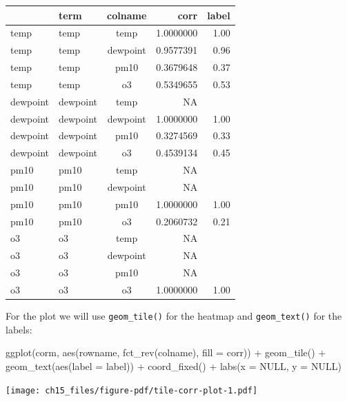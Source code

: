 \documentclass[
  letterpaper,
  DIV=11,
  numbers=noendperiod]{scrreprt}
\newenvironment{Shaded}{\begin{snugshade}}{\end{snugshade}}
\newcommand{\AttributeTok}[1]{\textcolor[rgb]{0.40,0.45,0.13}{#1}}
\newcommand{\ConstantTok}[1]{\textcolor[rgb]{0.56,0.35,0.01}{#1}}
\newcommand{\FunctionTok}[1]{\textcolor[rgb]{0.28,0.35,0.67}{#1}}
\newcommand{\NormalTok}[1]{\textcolor[rgb]{0.00,0.23,0.31}{#1}}
\newcommand{\SpecialCharTok}[1]{\textcolor[rgb]{0.37,0.37,0.37}{#1}}
\begin{document}
\begin{longtable*}{l|lcrr}
\toprule
{} & term & colname & corr & label \\ 
\midrule\addlinespace[2.5pt]
temp & temp & temp & 1.0000000 & 1.00 \\ 
temp & temp & dewpoint & 0.9577391 & 0.96 \\ 
temp & temp & pm10 & 0.3679648 & 0.37 \\ 
temp & temp & o3 & 0.5349655 & 0.53 \\ 
dewpoint & dewpoint & temp & NA &  \\ 
dewpoint & dewpoint & dewpoint & 1.0000000 & 1.00 \\ 
dewpoint & dewpoint & pm10 & 0.3274569 & 0.33 \\ 
dewpoint & dewpoint & o3 & 0.4539134 & 0.45 \\ 
pm10 & pm10 & temp & NA &  \\ 
pm10 & pm10 & dewpoint & NA &  \\ 
pm10 & pm10 & pm10 & 1.0000000 & 1.00 \\ 
pm10 & pm10 & o3 & 0.2060732 & 0.21 \\ 
o3 & o3 & temp & NA &  \\ 
o3 & o3 & dewpoint & NA &  \\ 
o3 & o3 & pm10 & NA &  \\ 
o3 & o3 & o3 & 1.0000000 & 1.00 \\ 
\bottomrule
\end{longtable*}

For the plot we will use \texttt{geom\_tile()} for the heatmap and
\texttt{geom\_text()} for the labels:

\begin{Shaded}
\begin{Highlighting}[]
\FunctionTok{ggplot}\NormalTok{(corm, }\FunctionTok{aes}\NormalTok{(rowname, }\FunctionTok{fct\_rev}\NormalTok{(colname),}
                 \AttributeTok{fill =}\NormalTok{ corr)) }\SpecialCharTok{+}
  \FunctionTok{geom\_tile}\NormalTok{() }\SpecialCharTok{+}
  \FunctionTok{geom\_text}\NormalTok{(}\FunctionTok{aes}\NormalTok{(}\AttributeTok{label =}\NormalTok{ label)) }\SpecialCharTok{+}
  \FunctionTok{coord\_fixed}\NormalTok{() }\SpecialCharTok{+}
  \FunctionTok{labs}\NormalTok{(}\AttributeTok{x =} \ConstantTok{NULL}\NormalTok{, }\AttributeTok{y =} \ConstantTok{NULL}\NormalTok{)}
\end{Highlighting}
\end{Shaded}

\texttt{[image: ch15\_files/figure-pdf/tile-corr-plot-1.pdf]}
\end{document}
